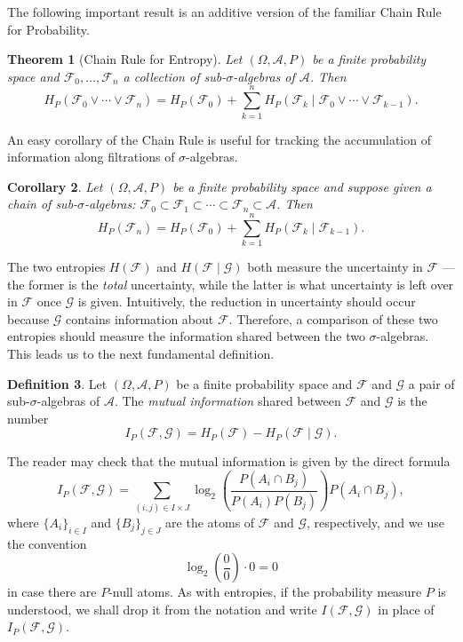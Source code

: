 \documentclass[11pt]{book}
\newtheorem{thm}{Theorem}[section]
\newtheorem{cor}[thm]{Corollary}
\theoremstyle{definition}
\newtheorem{defn}[thm]{Definition}
\numberwithin{equation}{section}
\begin{document}
The following important result is an additive version of the familiar Chain Rule for Probability.

\begin{thm}[Chain Rule for Entropy]
	Let $(\Omega,\mathcal{A},P)$ be a finite probability space and $\mathcal{F}_0,\ldots,\mathcal{F}_n$ a collection of sub-$\sigma$-algebras of $\mathcal{A}$. Then
	\[
		H_P(\mathcal{F}_0 \vee \cdots \vee \mathcal{F}_n) = H_P(\mathcal{F}_0) + \sum_{k=1}^n H_P(\mathcal{F}_k \mid \mathcal{F}_0 \vee \cdots \vee \mathcal{F}_{k-1}).
	\]
\end{thm}

An easy corollary of the Chain Rule is useful for tracking the accumulation of information along filtrations of $\sigma$-algebras.

\begin{cor}
	Let $(\Omega,\mathcal{A},P)$ be a finite probability space and suppose given a chain of sub-$\sigma$-algebras: $\mathcal{F}_0 \subset \mathcal{F}_1 \subset \cdots \subset \mathcal{F}_n \subset \mathcal{A}$. Then
	\[
		H_P(\mathcal{F}_n) = H_P(\mathcal{F}_0) + \sum_{k=1}^n H_P(\mathcal{F}_k \mid \mathcal{F}_{k-1}).
	\]
\end{cor}

The two entropies $H(\mathcal{F})$ and $H(\mathcal{F} \mid \mathcal{G})$ both measure the uncertainty in $\mathcal{F}$ — the former is the \textit{total} uncertainty, while the latter is what uncertainty is left over in $\mathcal{F}$ once $\mathcal{G}$ is given. Intuitively, the reduction in uncertainty should occur because $\mathcal{G}$ contains information about $\mathcal{F}$. Therefore, a comparison of these two entropies should measure the information shared between the two $\sigma$-algebras. This leads us to the next fundamental definition.

\begin{defn}
	Let $(\Omega,\mathcal{A},P)$ be a finite probability space and $\mathcal{F}$ and $\mathcal{G}$ a pair of sub-$\sigma$-algebras of $\mathcal{A}$. The \textit{mutual information} shared between $\mathcal{F}$ and $\mathcal{G}$ is the number
	\[
		I_P(\mathcal{F},\mathcal{G}) = H_P(\mathcal{F}) - H_P(\mathcal{F} \mid \mathcal{G}).
	\]
\end{defn}

The reader may check that the mutual information is given by the direct formula
\[
	I_P(\mathcal{F},\mathcal{G}) = \sum_{(i,j) \in I \times J} \log_2{ \left( \frac{P(A_i \cap B_j)}{P(A_i)P(B_j)} \right) } P(A_i \cap B_j),
\]
where $\{A_i\}_{i\in I}$ and $\{B_j\}_{j\in J}$ are the atoms of $\mathcal{F}$ and $\mathcal{G}$, respectively, and we use the convention
\[
	\log_2{ \left( \frac{0}{0} \right)} \cdot 0 =0
\]
in case there are $P$-null atoms. As with entropies, if the probability measure $P$ is understood, we shall drop it from the notation and write $I(\mathcal{F},\mathcal{G})$ in place of $I_P(\mathcal{F},\mathcal{G})$.
\end{document}

